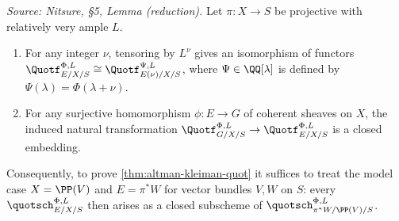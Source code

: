 \begin{lemma}
  \label{lem:quot-reduction}
  \textit{Source: Nitsure, §5, Lemma (reduction).}
  Let $\pi : X \to S$ be projective with relatively very ample $L$.
  \begin{enumerate}
    \item For any integer $\nu$, tensoring by $L^\nu$ gives an isomorphism of
      functors $\Quotf_{E/X/S}^{\Phi,L} \cong \Quotf_{E(\nu)/X/S}^{\Psi,L}$,
      where $\Psi \in \QQ[\lambda]$ is defined by $\Psi(\lambda) = \Phi(\lambda + \nu)$.
    \item For any surjective homomorphism $\phi : E \to G$ of coherent sheaves
      on $X$, the induced natural transformation
      $\Quotf_{G/X/S}^{\Phi,L} \to \Quotf_{E/X/S}^{\Phi,L}$ is a closed embedding.
  \end{enumerate}
  Consequently, to prove \cref{thm:altman-kleiman-quot} it suffices to treat the
  model case $X = \PP(V)$ and $E = \pi^* W$ for vector bundles $V, W$ on $S$:
  every $\quotsch_{E/X/S}^{\Phi,L}$ then arises as a closed subscheme of
  $\quotsch_{\pi^*W/\PP(V)/S}^{\Phi,L}$.
\end{lemma}

